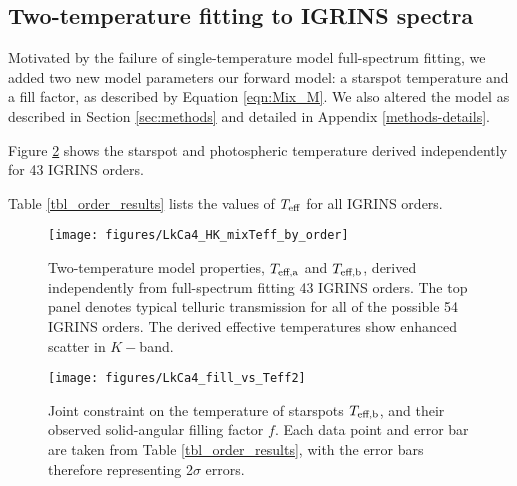 \documentclass[onecolumn]{emulateapj}%
\begin{document}
\subsection{Two-temperature fitting to IGRINS spectra}

Motivated by the failure of single-temperature model full-spectrum fitting, we added two new model parameters our forward model: a starspot temperature and a fill factor, as described by Equation \ref{eqn:Mix_M}.  We also altered the model as described in Section \ref{sec:methods} and detailed in Appendix \ref{methods-details}.  

Figure \ref{fig:TwoTempResults} shows the starspot and photospheric temperature derived independently for 43 IGRINS orders.

Table \ref{tbl_order_results} lists the values of $T_\textrm{eff}$ for all IGRINS orders.


\begin{figure*}
	\centering
	\texttt{[image: figures/LkCa4\_HK\_mixTeff\_by\_order]} 
	\caption{Two-temperature model properties, $T_\textrm{eff,a}$ and $T_\textrm{eff,b}$, derived independently from full-spectrum fitting 43 IGRINS orders.  The top panel denotes typical telluric transmission for all of the possible 54 IGRINS orders.  The derived effective temperatures show enhanced scatter in $K-$band.}
	\label{fig:TwoTempResults}
\end{figure*}





\begin{figure*}
	\centering
	\texttt{[image: figures/LkCa4\_fill\_vs\_Teff2]} 
	\caption{Joint constraint on the temperature of starspots $T_\textrm{eff,b}$, and their observed solid-angular filling factor $f$.  Each data point and error bar are taken from Table \ref{tbl_order_results}, with the error bars therefore representing 2$\sigma$ errors.}
	\label{fig:TwoTempResults}
\end{figure*}
\end{document}
